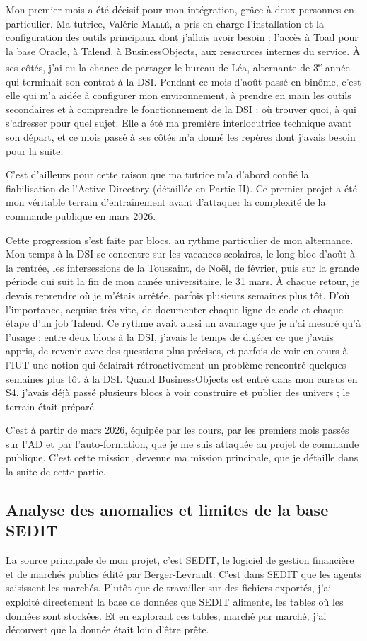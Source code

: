 \documentclass[11pt,a4paper]{article}
\begin{document}
Mon premier mois a été décisif pour mon intégration, grâce à deux personnes en particulier. Ma tutrice, Valérie \textsc{Mallé}, a pris en charge l'installation et la configuration des outils principaux dont j'allais avoir besoin : l'accès à Toad pour la base Oracle, à Talend, à BusinessObjects, aux ressources internes du service. À ses côtés, j'ai eu la chance de partager le bureau de Léa, alternante de 3\textsuperscript{e} année qui terminait son contrat à la DSI. Pendant ce mois d'août passé en binôme, c'est elle qui m'a aidée à configurer mon environnement, à prendre en main les outils secondaires et à comprendre le fonctionnement de la DSI : où trouver quoi, à qui s'adresser pour quel sujet. Elle a été ma première interlocutrice technique avant son départ, et ce mois passé à ses côtés m'a donné les repères dont j'avais besoin pour la suite.

C'est d'ailleurs pour cette raison que ma tutrice m'a d'abord confié la fiabilisation de l'Active Directory (détaillée en Partie II). Ce premier projet a été mon véritable terrain d'entraînement avant d'attaquer la complexité de la commande publique en mars 2026.

Cette progression s'est faite par blocs, au rythme particulier de mon alternance. Mon temps à la DSI se concentre sur les vacances scolaires, le long bloc d'août à la rentrée, les intersessions de la Toussaint, de Noël, de février, puis sur la grande période qui suit la fin de mon année universitaire, le 31 mars. À chaque retour, je devais reprendre où je m'étais arrêtée, parfois plusieurs semaines plus tôt. D'où l'importance, acquise très vite, de documenter chaque ligne de code et chaque étape d'un job Talend. Ce rythme avait aussi un avantage que je n'ai mesuré qu'à l'usage : entre deux blocs à la DSI, j'avais le temps de digérer ce que j'avais appris, de revenir avec des questions plus précises, et parfois de voir en cours à l'IUT une notion qui éclairait rétroactivement un problème rencontré quelques semaines plus tôt à la DSI. Quand BusinessObjects est entré dans mon cursus en S4, j'avais déjà passé plusieurs blocs à voir construire et publier des univers ; le terrain était préparé.

C'est à partir de mars 2026, équipée par les cours, par les premiers mois passés sur l'AD et par l'auto-formation, que je me suis attaquée au projet de commande publique. C'est cette mission, devenue ma mission principale, que je détaille dans la suite de cette partie.

\subsection{Analyse des anomalies et limites de la base SEDIT}
La source principale de mon projet, c'est SEDIT, le logiciel de gestion financière et de marchés publics édité par Berger-Levrault. C'est dans SEDIT que les agents saisissent les marchés. Plutôt que de travailler sur des fichiers exportés, j'ai exploité directement la base de données que SEDIT alimente, les tables où les données sont stockées. Et en explorant ces tables, marché par marché, j'ai découvert que la donnée était loin d'être prête.
\end{document}
